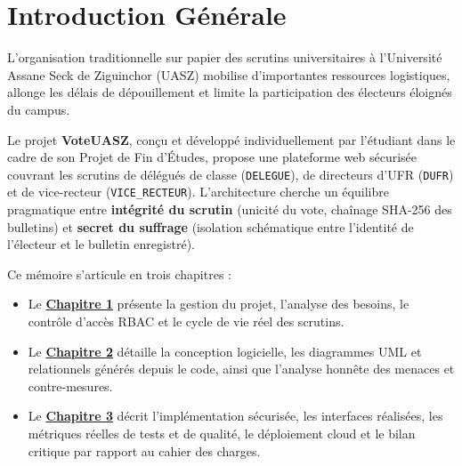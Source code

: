 \documentclass[11pt,a4paper]{report}
\begin{document}
\tableofcontents
\listoffigures
\listoftables

\clearpage
{}

\chapter*{Introduction Générale}

L'organisation traditionnelle sur papier des scrutins universitaires à l'Université Assane Seck de Ziguinchor (UASZ) mobilise d'importantes ressources logistiques, allonge les délais de dépouillement et limite la participation des électeurs éloignés du campus.

Le projet \textbf{VoteUASZ}, conçu et développé individuellement par l'étudiant dans le cadre de son Projet de Fin d'Études, propose une plateforme web sécurisée couvrant les scrutins de délégués de classe (\texttt{DELEGUE}), de directeurs d'UFR (\texttt{DUFR}) et de vice-recteur (\texttt{VICE\_RECTEUR}). L'architecture cherche un équilibre pragmatique entre \textbf{intégrité du scrutin} (unicité du vote, chaînage SHA-256 des bulletins) et \textbf{secret du suffrage} (isolation schématique entre l'identité de l'électeur et le bulletin enregistré).

Ce mémoire s'articule en trois chapitres :
\begin{itemize}
    \item Le \hyperref[chap:1]{\textbf{Chapitre 1}} présente la gestion du projet, l'analyse des besoins, le contrôle d'accès RBAC et le cycle de vie réel des scrutins.
    \item Le \hyperref[chap:2]{\textbf{Chapitre 2}} détaille la conception logicielle, les diagrammes UML et relationnels générés depuis le code, ainsi que l'analyse honnête des menaces et contre-mesures.
    \item Le \hyperref[chap:3]{\textbf{Chapitre 3}} décrit l'implémentation sécurisée, les interfaces réalisées, les métriques réelles de tests et de qualité, le déploiement cloud et le bilan critique par rapport au cahier des charges.
\end{itemize}





\end{document}
